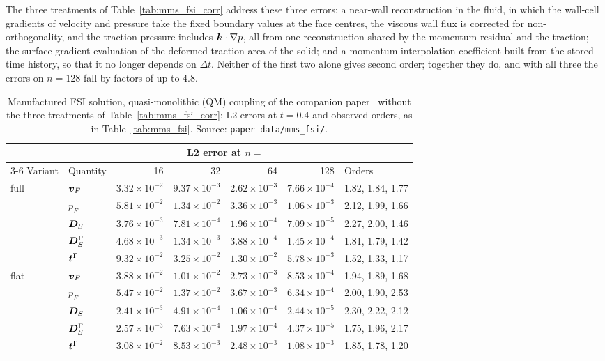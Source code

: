 The three treatments of Table~\ref{tab:mms_fsi_corr} address these three errors: a near-wall reconstruction in the fluid, in which the wall-cell gradients of velocity and pressure take the fixed boundary values at the face centres, the viscous wall flux is corrected for non-orthogonality, and the traction pressure includes $\boldsymbol{k}\cdot\nabla p$, all from one reconstruction shared by the momentum residual and the traction; the surface-gradient evaluation of the deformed traction area of the solid; and a momentum-interpolation coefficient built from the stored time history, so that it no longer depends on $\Delta t$.
Neither of the first two alone gives second order; together they do, and with all three the errors on $n = 128$ fall by factors of up to $4.8$.

\begin{table}[htbp]
	\centering
	\footnotesize
	\setlength{\tabcolsep}{4pt}
	\caption{Manufactured FSI solution, quasi-monolithic (QM) coupling of the companion paper~\citep{CardiffBatistic2026QM} without the three treatments of Table~\ref{tab:mms_fsi_corr}: L2 errors at $t = 0.4$ and observed orders, as in Table~\ref{tab:mms_fsi}. Source: \texttt{paper-data/mms\_fsi/}.}
	\label{tab:mms_fsi_qm}
	\begin{tabular}{llrrrrl}
		\toprule
		 & & \multicolumn{4}{c}{L2 error at $n =$} & \\
		\cmidrule(lr){3-6}
		Variant & Quantity & 16 & 32 & 64 & 128 & Orders \\
		\midrule
		full & $\boldsymbol{v}_F$ & $3.32\times10^{-2}$ & $9.37\times10^{-3}$ & $2.62\times10^{-3}$ & $7.66\times10^{-4}$ & 1.82, 1.84, 1.77 \\
		 & $p_F$ & $5.81\times10^{-2}$ & $1.34\times10^{-2}$ & $3.36\times10^{-3}$ & $1.06\times10^{-3}$ & 2.12, 1.99, 1.66 \\
		 & $\boldsymbol{D}_S$ & $3.76\times10^{-3}$ & $7.81\times10^{-4}$ & $1.96\times10^{-4}$ & $7.09\times10^{-5}$ & 2.27, 2.00, 1.46 \\
		 & $\boldsymbol{D}_S^\Gamma$ & $4.68\times10^{-3}$ & $1.34\times10^{-3}$ & $3.88\times10^{-4}$ & $1.45\times10^{-4}$ & 1.81, 1.79, 1.42 \\
		 & $\boldsymbol{t}^\Gamma$ & $9.32\times10^{-2}$ & $3.25\times10^{-2}$ & $1.30\times10^{-2}$ & $5.78\times10^{-3}$ & 1.52, 1.33, 1.17 \\
		\midrule
		flat & $\boldsymbol{v}_F$ & $3.88\times10^{-2}$ & $1.01\times10^{-2}$ & $2.73\times10^{-3}$ & $8.53\times10^{-4}$ & 1.94, 1.89, 1.68 \\
		 & $p_F$ & $5.47\times10^{-2}$ & $1.37\times10^{-2}$ & $3.67\times10^{-3}$ & $6.34\times10^{-4}$ & 2.00, 1.90, 2.53 \\
		 & $\boldsymbol{D}_S$ & $2.41\times10^{-3}$ & $4.91\times10^{-4}$ & $1.06\times10^{-4}$ & $2.44\times10^{-5}$ & 2.30, 2.22, 2.12 \\
		 & $\boldsymbol{D}_S^\Gamma$ & $2.57\times10^{-3}$ & $7.63\times10^{-4}$ & $1.97\times10^{-4}$ & $4.37\times10^{-5}$ & 1.75, 1.96, 2.17 \\
		 & $\boldsymbol{t}^\Gamma$ & $3.08\times10^{-2}$ & $8.53\times10^{-3}$ & $2.48\times10^{-3}$ & $1.08\times10^{-3}$ & 1.85, 1.78, 1.20 \\
		\bottomrule
	\end{tabular}
\end{table}

